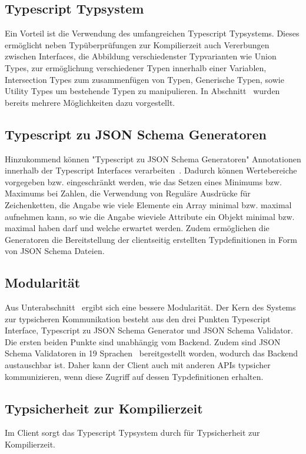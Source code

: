 \subsection{Typescript Typsystem}
\label{sec:requirements:pros:typescript}
Ein Vorteil ist die Verwendung des umfangreichen Typescript Typsystems.
Dieses ermöglicht neben Typüberprüfungen zur Kompilierzeit auch Vererbungen zwischen Interfaces, die Abbildung verschiedenster Typvarianten wie
Union Types, zur ermöglichung verschiedener Typen innerhalb einer Variablen, Intersection Types zum zusammenfügen von Typen,
Generische Typen, sowie Utility Types um bestehende Typen zu manipulieren.
In Abschnitt~ wurden bereits mehrere Möglichkeiten dazu vorgestellt.

\subsection{Typescript zu JSON Schema Generatoren}
\label{sec:requirements:pros:generation}
Hinzukommend können "Typescript zu JSON Schema Generatoren" Annotationen innerhalb der Typescript Interfaces verarbeiten~\cite{json-schema-generator-annotations}.
Dadurch können Wertebereiche vorgegeben bzw. eingeschränkt werden,
wie das Setzen eines Minimums bzw. Maximums bei Zahlen, die Verwendung von Reguläre Ausdrücke für Zeichenketten,
die Angabe wie viele Elemente ein Array minimal bzw. maximal aufnehmen kann,
so wie die Angabe wieviele Attribute ein Objekt minimal bzw. maximal haben darf und welche erwartet werden.
Zudem ermöglichen die Generatoren die Bereitstellung der clientseitig erstellten Typdefinitionen in Form von JSON Schema Dateien.

\subsection{Modularität}
\label{sec:requirements:pros:modul}
Aus Unterabschnitt~ ergibt sich eine bessere Modularität.
Der Kern des Systems zur typsicheren Kommunikation besteht aus den drei Punkten Typescript Interface, Typescript zu JSON Schema Generator und
JSON Schema Validator. Die ersten beiden Punkte sind unabhängig vom Backend.
Zudem sind JSON Schema Validatoren in 19 Sprachen~\cite{json-schema-implementations} bereitgestellt worden, wodurch das Backend austauschbar ist.
Daher kann der Client auch mit anderen APIs typsicher kommunizieren, wenn diese Zugriff auf dessen Typdefinitionen erhalten.

\subsection{Typsicherheit zur Kompilierzeit}
\label{sec:requirements:pros:typesafe-compile}
Im Client sorgt das Typescript Typsystem durch für Typsicherheit zur Kompilierzeit.

